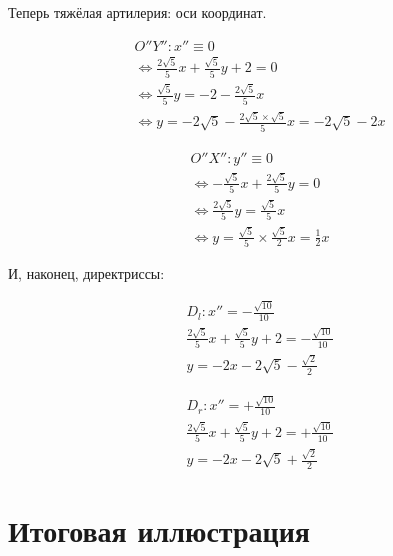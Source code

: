 \documentclass[12pt, a4paper]{article}
\begin{document}
    Теперь тяжёлая артилерия: оси координат.

    \begin{multline}
        O''Y'': x'' \equiv 0 \\
        \Longleftrightarrow \frac{2 \sqrt{5}}{5} x + \frac{\sqrt{5}}{5} y + 2 = 0 \\
        \Longleftrightarrow \frac{\sqrt{5}}{5} y = -2 -\frac{2 \sqrt{5}}{5} x \\
        \Longleftrightarrow y = -2\sqrt{5} -\frac{2 \sqrt{5} \times \sqrt{5} }{5} x = -2\sqrt{5} - 2x
    \end{multline}

    \begin{multline}
        O''X'': y'' \equiv 0 \\
        \Longleftrightarrow - \frac{\sqrt{5}}{5} x + \frac{2 \sqrt{5}}{5} y = 0 \\
        \Longleftrightarrow \frac{2 \sqrt{5}}{5} y = \frac{\sqrt{5}}{5} x \\
        \Longleftrightarrow y = \frac{\sqrt{5}}{5} \times \frac{\sqrt{5}}{2} x = \frac{1}{2} x
    \end{multline}


    И, наконец, директриссы:
    
    \begin{gather}
        D_l: x'' = -\frac{\sqrt{10}}{10} \\
        \frac{2 \sqrt{5}}{5} x + \frac{\sqrt{5}}{5} y + 2 = -\frac{\sqrt{10}}{10} \\
        y = -2 x - 2 \sqrt{5} - \frac{\sqrt{2}}{2}
    \end{gather}
    
    \begin{gather}
        D_r: x'' = +\frac{\sqrt{10}}{10} \\
        \frac{2 \sqrt{5}}{5} x + \frac{\sqrt{5}}{5} y + 2 = +\frac{\sqrt{10}}{10} \\
        y = -2 x - 2 \sqrt{5} + \frac{\sqrt{2}}{2}
    \end{gather}

    \section{Итоговая иллюстрация}
    
\end{document}
